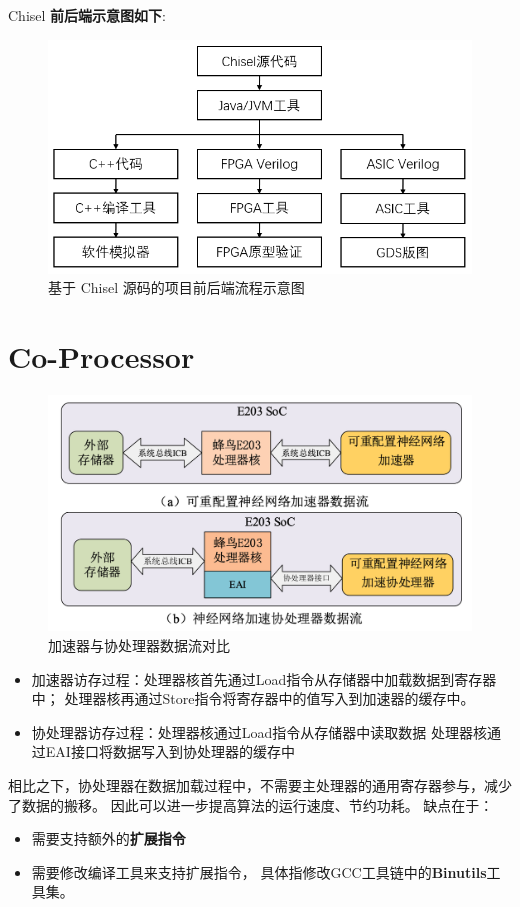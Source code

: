 \documentclass{article}
\begin{document}
Chisel \textbf{前后端示意图如下}:\cite{riscv3}
\begin{figure}[H]
    \begin{center}
        \includegraphics[width=\textwidth]{chisel}
    \end{center}
    \caption{基于 Chisel 源码的项目前后端流程示意图}
    \label{fig: chisel}
\end{figure}


\section{Co-Processor}
\begin{figure}[H]
    \begin{center}
        \includegraphics[width=\textwidth]{acc}
    \end{center}
    \caption{加速器与协处理器数据流对比}
    \label{fig: acc}
\end{figure}
\begin{itemize}
    \item 加速器访存过程：处理器核首先通过Load指令从存储器中加载数据到寄存器中；
      处理器核再通过Store指令将寄存器中的值写入到加速器的缓存中。
    \item 协处理器访存过程：处理器核通过Load指令从存储器中读取数据
        处理器核通过EAI接口将数据写入到协处理器的缓存中
\end{itemize}
相比之下，协处理器在数据加载过程中，不需要主处理器的通用寄存器参与，减少了数据的搬移。
因此可以进一步提高算法的运行速度、节约功耗\cite{riscv5}。
缺点在于：
\begin{itemize}
    \item 需要支持额外的\textbf{扩展指令}
    \item 需要修改编译工具来支持扩展指令，
        具体指修改GCC工具链中的\textbf{Binutils}工具集\cite{riscv5}。
\end{itemize}


\newpage
\end{document}
